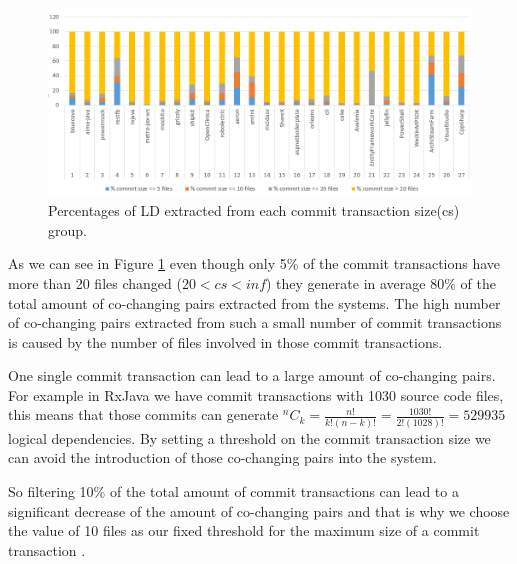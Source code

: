 \documentclass[12pt, a4paper, twoside]{report}
\newcommand*{\Comb}[2]{{}^{#1}C_{#2}}%
\begin{document}
\begin{figure}[!h]
\centering
\includegraphics[width=\textwidth]{ld_distribution.png}
\caption{Percentages of LD extracted from each commit transaction size(cs) group.}
\label{fig:fig_ld_cs}
\centering
\end{figure}

As we can see in Figure \ref{fig:fig_ld_cs} even though only 5\% of the commit transactions have more than 20 files changed ($20<cs<inf$) they generate in average 80\% of the total amount of co-changing pairs extracted from the systems.
The high number of co-changing pairs extracted from such a small number of commit transactions is caused by the number of files involved in those commit transactions. 

One single commit transaction can lead to a large amount of co-changing pairs. For example in RxJava we have commit transactions with 1030 source code files, this means that those commits can generate 
$\Comb{n}{k}=\frac{n!}{k!(n-k)!} = \frac{1030!}{2!(1028)!} = 529 935$ logical dependencies. By setting a threshold on the commit transaction size we can avoid the introduction of those co-changing pairs into the system.



So filtering 10\% of the total amount of commit transactions can lead to a significant decrease of the amount of co-changing pairs and that is why we choose the value of 10 files as our fixed threshold for the maximum size of a commit transaction \cite{DepSACI}.
\end{document}
